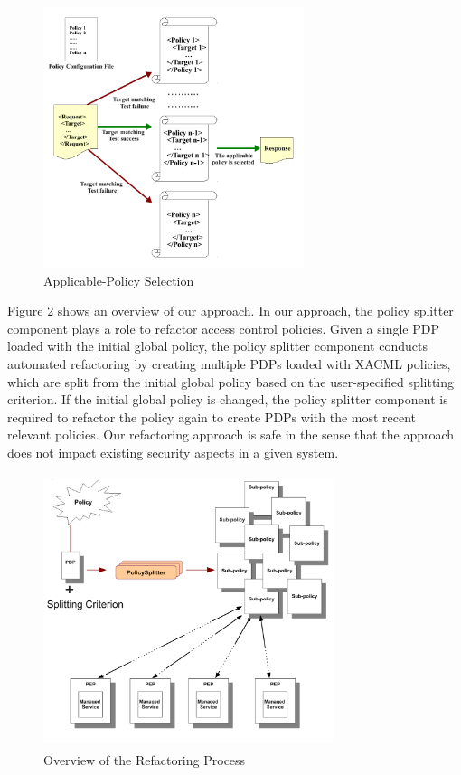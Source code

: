 \begin{figure}[!h]
\begin{center}
\includegraphics[width=3in, height=3in]{requestevaluation}
\caption{Applicable-Policy Selection}
\label{requestevaluation}
\end{center}
\end{figure}


Figure \ref{overallprocess} shows an overview of our approach.
In our approach, the policy splitter component plays a role to refactor access control policies.
Given a single PDP loaded with the initial global policy, the policy splitter component conducts automated refactoring 
by creating multiple PDPs loaded with XACML policies, which are split from the initial global policy based on the user-specified splitting criterion. 
If the initial global policy is changed, the policy splitter component is required to refactor the policy again to create PDPs with the most recent relevant policies.
Our refactoring approach is safe in the sense that the approach does not impact existing security aspects in a given
system. 


\begin{figure}[!h]
\begin{center}
\includegraphics[width=8.5cm, height=8cm]{Overall-process}
\caption{Overview of the Refactoring Process}
\label{overallprocess}
\end{center}
\end{figure}


